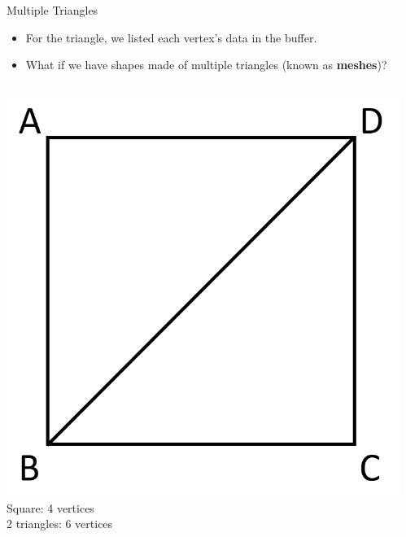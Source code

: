 \begin{frame}{Multiple Triangles}
	\begin{itemize}
		\pause\item For the triangle, we listed each vertex's data in the buffer.
		\pause\item What if we have shapes made of multiple triangles (known as \textbf{meshes})?
	\end{itemize}
	\begin{columns}
		\begin{column}{0.5\textwidth}
			\begin{center}
				\pause\includegraphics[height=0.3\textheight]{square_vertices}\\
				Square: 4 vertices\\
				2 triangles: 6 vertices
			\end{center}
		\end{column}
		\begin{column}{0.45\textwidth}
			\begin{center}

\end{center}
\end{column}
\end{columns}
\end{frame}
